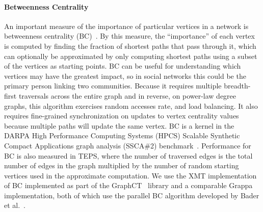 \paragraph{Betweenness Centrality}
An important measure of the importance of particular vertices in a
network is betweenness centrality
(BC)~\cite{freeman1979centrality}. By this measure, the ``importance''
of each vertex is computed by finding the fraction of shortest paths
that pass through it, which can optionally be approximated by only
computing shortest paths using a subset of the vertices as starting
points. BC can be useful for understanding which vertices may have the
greatest impact, so in social networks this could be the primary
person linking two communities. Because it requires multiple
breadth-first traversals across the entire graph and in reverse, on
power-law degree graphs, this algorithm exercises random accesses
rate, and load balancing. It also requires fine-grained
synchronization on updates to vertex centrality values because
multiple paths will update the same vertex. BC is a kernel in the
DARPA High Performance Computing Systems (HPCS) Scalable Synthetic
Compact Applications graph analysis (SSCA\#2)
benchmark~\cite{ssca2}. Performance for BC is also measured in TEPS,
where the number of traversed edges is the total number of edges in
the graph multiplied by the number of random starting vertices used in
the approximate computation. We use the XMT implementation of BC
implemented as part of the GraphCT~\cite{GraphCT} library and a
comparable Grappa implementation, both of which use the parallel BC
algorithm developed by Bader et al.~\cite{bader:bc}.

